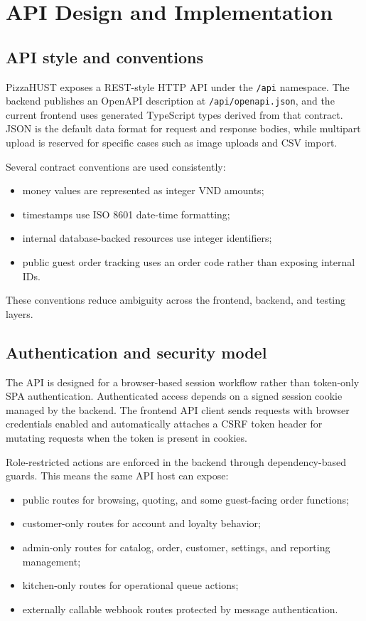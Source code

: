 \section{API Design and Implementation}

\subsection{API style and conventions}

PizzaHUST exposes a REST-style HTTP API under the \texttt{/api} namespace. The backend publishes an OpenAPI description at \texttt{/api/openapi.json}, and the current frontend uses generated TypeScript types derived from that contract. JSON is the default data format for request and response bodies, while multipart upload is reserved for specific cases such as image uploads and CSV import.

Several contract conventions are used consistently:

\begin{itemize}
    \item money values are represented as integer VND amounts;
    \item timestamps use ISO 8601 date-time formatting;
    \item internal database-backed resources use integer identifiers;
    \item public guest order tracking uses an order code rather than exposing internal IDs.
\end{itemize}

These conventions reduce ambiguity across the frontend, backend, and testing layers.

\subsection{Authentication and security model}

The API is designed for a browser-based session workflow rather than token-only SPA authentication. Authenticated access depends on a signed session cookie managed by the backend. The frontend API client sends requests with browser credentials enabled and automatically attaches a CSRF token header for mutating requests when the token is present in cookies.

Role-restricted actions are enforced in the backend through dependency-based guards. This means the same API host can expose:

\begin{itemize}
    \item public routes for browsing, quoting, and some guest-facing order functions;
    \item customer-only routes for account and loyalty behavior;
    \item admin-only routes for catalog, order, customer, settings, and reporting management;
    \item kitchen-only routes for operational queue actions;
    \item externally callable webhook routes protected by message authentication.
\end{itemize}

